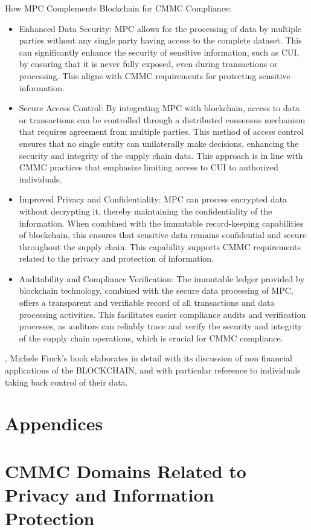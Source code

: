 \documentclass{tufte-handout}
\newcommand{\customappendix}{
    \clearpage %
    \appendix %
    \pagestyle{empty} %
    \titleformat{\section}[display]{\normalfont\Large\bfseries}{\appendixname~\thesection}{0pt}{\Large}
    \titlespacing*{\section}{0pt}{50pt}{40pt}
    \section*{Appendices} %
    \addcontentsline{toc}{section}{Appendices} %
}
\begin{document}
How MPC Complements Blockchain for CMMC Compliance:
\begin{itemize}
\item Enhanced Data Security: MPC allows for the processing of data by multiple parties without any single party having access to the complete dataset. This can significantly
enhance the security of sensitive information, such as CUI, by ensuring that it is never fully exposed, even during transactions or processing. This aligns with CMMC requirements
for protecting sensitive information.
\item Secure Access Control: By integrating MPC with blockchain, access to data or transactions can be controlled through a distributed consensus mechanism that requires agreement
from multiple parties. This method of access control ensures that no single entity can unilaterally make decisions, enhancing the security and integrity of the supply chain data.
This approach is in line with CMMC practices that emphasize limiting access to CUI to authorized individuals.
\item Improved Privacy and Confidentiality: MPC can process encrypted data without decrypting it, thereby maintaining the confidentiality of the information. When combined with the
immutable record-keeping capabilities of blockchain, this ensures that sensitive data remains confidential and secure throughout the supply chain. This capability supports CMMC
requirements related to the privacy and protection of information.
\item Auditability and Compliance Verification: The immutable ledger provided by blockchain technology, combined with the secure data processing of MPC, offers a transparent and
verifiable record of all transactions and data processing activities. This facilitates easier compliance audits and verification processes, as auditors can reliably trace and
verify the security and integrity of the supply chain operations, which is crucial for CMMC compliance.
\end{itemize}

,\cite{Finck2018} Michele Finck's book elaborates
in detail with its discussion of non financial applications of the BLOCKCHAIN, and with particular reference to individuals taking back control of their data.




\customappendix
\section{CMMC Domains Related to Privacy and Information Protection}
\end{document}
